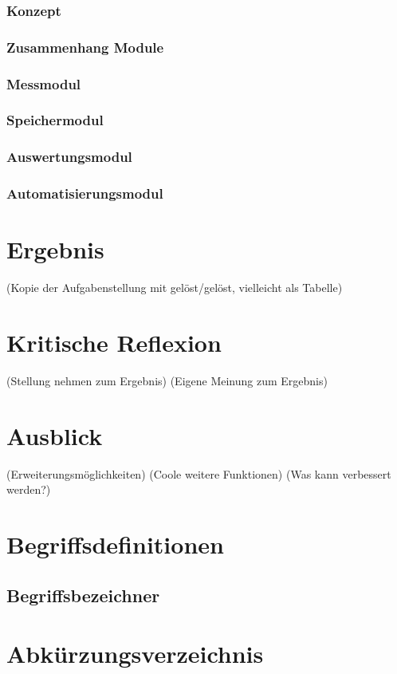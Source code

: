 \documentclass[
    load-dhbw-templates,
    load-preamble = true,
    auto-intro-pages = all,
    add-tocs-to-toc,
    debug = true,
    language = english,
    mainlanguage = ngerman,
    add-bibliography,
    bib-file = dhbw-source.bib,
    biblatex/style = alphabetic, 
]{iodhbwm}
\begin{document}
        \subsection{Konzept}
        \subsection{Zusammenhang Module}
        \subsection{Messmodul}
        \subsection{Speichermodul}
        \subsection{Auswertungsmodul}
        \subsection{Automatisierungsmodul}
    
\chapter{Ergebnis}
    (Kopie der Aufgabenstellung mit gelöst/gelöst, vielleicht als Tabelle)
    
\chapter{Kritische Reflexion}
    (Stellung nehmen zum Ergebnis)
    (Eigene Meinung zum Ergebnis)

\chapter{Ausblick}
    (Erweiterungsmöglichkeiten)
    (Coole weitere Funktionen)
    (Was kann verbessert werden?)

\appendix
\chapter{Begriffsdefinitionen}

\section{Begriffsbezeichner} \label{sec:Begriffsbezeichner}




\chapter{Abkürzungsverzeichnis}




\nocite{*}
\end{document}
